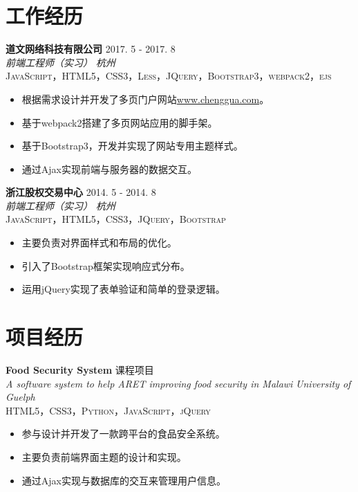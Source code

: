 \documentclass[10pt, letterpaper]{article}
\newcommand{\project}[6]{
	\noindent
    \textbf{\color{darktext}#1} \hfill {#2} \\
    \textit{\color{hardtext}#3} \hfill \textit{\color{awesome-emerald}#4}\\
    \textsc{#5}
    {#6}
    \vspace{10pt}
}
\begin{document}

\section*{工作经历}

\project{道文网络科技有限公司}{2017. 5 - 2017. 8}
{前端工程师（实习）}{杭州}
{JavaScript，HTML5，CSS3，Less，JQuery，Bootstrap3，webpack2，ejs}
{\begin{itemize}[leftmargin=*]
  	\item 根据需求设计并开发了多页门户网站\href{www.chenggua.com}{www.chenggua.com}。
  	\item 基于webpack2搭建了多页网站应用的脚手架。
    \item 基于Bootstrap3，开发并实现了网站专用主题样式。
    \item 通过Ajax实现前端与服务器的数据交互。
\end{itemize}}

\project{浙江股权交易中心}{2014. 5 - 2014. 8}
{前端工程师（实习）}{杭州}
{JavaScript，HTML5，CSS3，JQuery，Bootstrap}
{\begin{itemize}[leftmargin=*]
    \item 主要负责对界面样式和布局的优化。
    \item 引入了Bootstrap框架实现响应式分布。
    \item 运用jQuery实现了表单验证和简单的登录逻辑。
\end{itemize}}

\section*{项目经历}

\project{Food Security System}{课程项目}
{A software system to help ARET improving food security in Malawi}{University of Guelph}
{HTML5，CSS3，Python，JavaScript，jQuery}
{\begin{itemize}[leftmargin=*]
    \item 参与设计并开发了一款跨平台的食品安全系统。
    \item 主要负责前端界面主题的设计和实现。
    \item 通过Ajax实现与数据库的交互来管理用户信息。
\end{itemize}}
\end{document}
